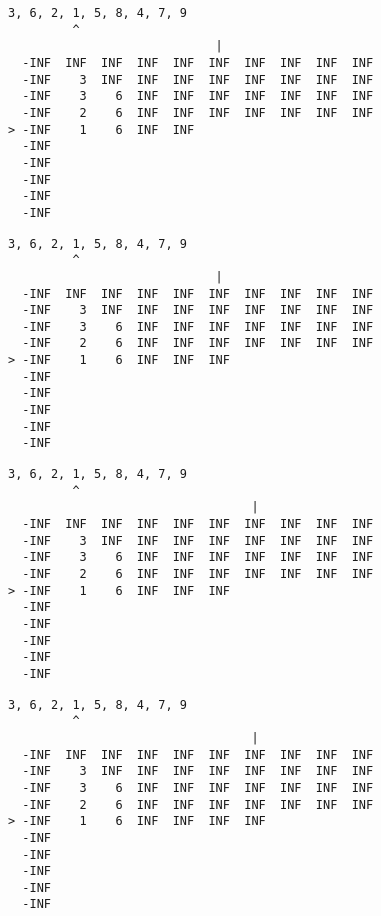 { \begin{verbatim}
3, 6, 2, 1, 5, 8, 4, 7, 9
         ^
                             |
  -INF  INF  INF  INF  INF  INF  INF  INF  INF  INF
  -INF    3  INF  INF  INF  INF  INF  INF  INF  INF
  -INF    3    6  INF  INF  INF  INF  INF  INF  INF
  -INF    2    6  INF  INF  INF  INF  INF  INF  INF
> -INF    1    6  INF  INF                         
  -INF                                             
  -INF                                             
  -INF                                             
  -INF                                             
  -INF                                             
\end{verbatim} }

{ \begin{verbatim}
3, 6, 2, 1, 5, 8, 4, 7, 9
         ^
                             |
  -INF  INF  INF  INF  INF  INF  INF  INF  INF  INF
  -INF    3  INF  INF  INF  INF  INF  INF  INF  INF
  -INF    3    6  INF  INF  INF  INF  INF  INF  INF
  -INF    2    6  INF  INF  INF  INF  INF  INF  INF
> -INF    1    6  INF  INF  INF                    
  -INF                                             
  -INF                                             
  -INF                                             
  -INF                                             
  -INF                                             
\end{verbatim} }

{ \begin{verbatim}
3, 6, 2, 1, 5, 8, 4, 7, 9
         ^
                                  |
  -INF  INF  INF  INF  INF  INF  INF  INF  INF  INF
  -INF    3  INF  INF  INF  INF  INF  INF  INF  INF
  -INF    3    6  INF  INF  INF  INF  INF  INF  INF
  -INF    2    6  INF  INF  INF  INF  INF  INF  INF
> -INF    1    6  INF  INF  INF                    
  -INF                                             
  -INF                                             
  -INF                                             
  -INF                                             
  -INF                                             
\end{verbatim} }

{ \begin{verbatim}
3, 6, 2, 1, 5, 8, 4, 7, 9
         ^
                                  |
  -INF  INF  INF  INF  INF  INF  INF  INF  INF  INF
  -INF    3  INF  INF  INF  INF  INF  INF  INF  INF
  -INF    3    6  INF  INF  INF  INF  INF  INF  INF
  -INF    2    6  INF  INF  INF  INF  INF  INF  INF
> -INF    1    6  INF  INF  INF  INF               
  -INF                                             
  -INF                                             
  -INF                                             
  -INF                                             
  -INF                                             
\end{verbatim} }

